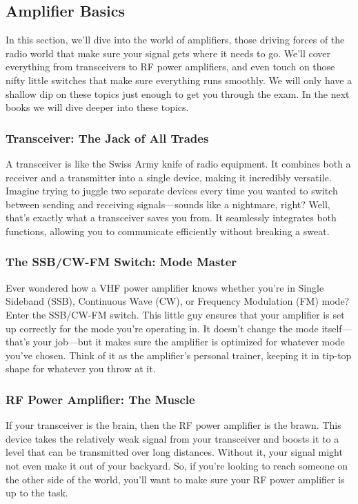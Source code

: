 \subsection{Amplifier Basics}
\label{subsec:amp-basics}

In this section, we'll dive into the world of amplifiers, those driving forces of the radio world that make sure your signal gets where it needs to go. We'll cover everything from transceivers to RF power amplifiers, and even touch on those nifty little switches that make sure everything runs smoothly. We will only have a shallow dip on these topics just enough to get you through the exam. In the next books we will dive deeper into these topics.

\subsubsection*{Transceiver: The Jack of All Trades}
A transceiver is like the Swiss Army knife of radio equipment. It combines both a receiver and a transmitter into a single device, making it incredibly versatile. Imagine trying to juggle two separate devices every time you wanted to switch between sending and receiving signals—sounds like a nightmare, right? Well, that's exactly what a transceiver saves you from. It seamlessly integrates both functions, allowing you to communicate efficiently without breaking a sweat.


\subsubsection*{The SSB/CW-FM Switch: Mode Master}
Ever wondered how a VHF power amplifier knows whether you're in Single Sideband (SSB), Continuous Wave (CW), or Frequency Modulation (FM) mode? Enter the SSB/CW-FM switch. This little guy ensures that your amplifier is set up correctly for the mode you're operating in. It doesn't change the mode itself—that's your job—but it makes sure the amplifier is optimized for whatever mode you've chosen. Think of it as the amplifier's personal trainer, keeping it in tip-top shape for whatever you throw at it.


\subsubsection*{RF Power Amplifier: The Muscle}
If your transceiver is the brain, then the RF power amplifier is the brawn. This device takes the relatively weak signal from your transceiver and boosts it to a level that can be transmitted over long distances. Without it, your signal might not even make it out of your backyard. So, if you're looking to reach someone on the other side of the world, you'll want to make sure your RF power amplifier is up to the task.


